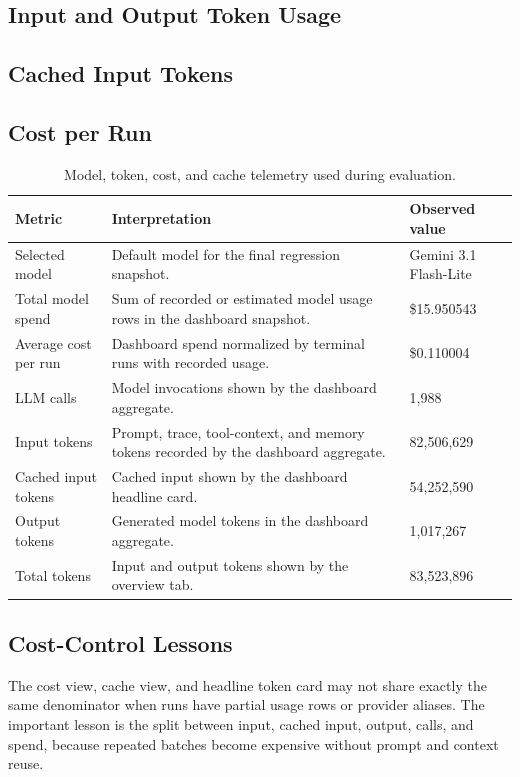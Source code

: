 \subsection{Input and Output Token Usage}

\subsection{Cached Input Tokens}

\subsection{Cost per Run}

\begin{table}[!htbp]
\centering
\begin{tabularx}{\textwidth}{Q{4.0cm}Y Z{3.0cm}}
\toprule
{}
Metric & Interpretation & Observed value \\
\midrule
Selected model & Default model for the final regression snapshot. &
Gemini 3.1 Flash-Lite \\
Total model spend & Sum of recorded or estimated model usage rows in the
dashboard snapshot. & \$15.950543 \\
Average cost per run & Dashboard spend normalized by terminal runs with
recorded usage. & \$0.110004 \\
LLM calls & Model invocations shown by the dashboard aggregate. & 1,988 \\
Input tokens & Prompt, trace, tool-context, and memory tokens recorded by the
dashboard aggregate. & 82,506,629 \\
Cached input tokens & Cached input shown by the dashboard headline card. &
54,252,590 \\
Output tokens & Generated model tokens in the dashboard aggregate. & 1,017,267 \\
Total tokens & Input and output tokens shown by the overview tab. & 83,523,896 \\
\bottomrule
\end{tabularx}
\caption{Model, token, cost, and cache telemetry used during evaluation.}
\label{tab:model-cost-summary}
\end{table}

\subsection{Cost-Control Lessons}

The cost view, cache view, and headline token card may not share exactly the
same denominator when runs have partial usage rows or provider aliases. The
important lesson is the split between input, cached input, output, calls, and
spend, because repeated batches become expensive without prompt and context
reuse.

